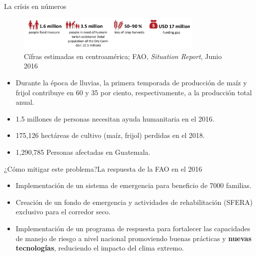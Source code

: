 \documentclass[]{beamer}
\begin{document}
\begin{frame}{La crísis en números}
    \begin{figure}
        \centering
        \includegraphics[width=0.8\textwidth]{Docs/cs_in_numbers}
        \caption{Cífras estimadas en centroamérica;  FAO, \textit{Situation Report}, Junio 2016}
        \label{fig:my_label}
    \end{figure}
    \begin{itemize}
      \item Durante la época de lluvias, la primera temporada de producción de maíz y frijol contribuye en 60 y 35 por ciento, respectivamente, a la producción total anual.
      \item 1.5 millones de personas necesitan ayuda humanitaria en el 2016. %
      \item 175,126 hectáreas de cultivo (maíz, frijol) perdidas en el 2018. %
      \item 1,290,785 Personas afectadas en Guatemala. %
    \end{itemize}
\end{frame}

\begin{frame}{¿Cómo mitigar este problema?}{La respuesta de la FAO en el 2016}
      \begin{itemize}
        \item Implementación de un sistema de emergencia  para beneficio de 7000 familias.
        \item Creación de un fondo de emergencia y actividades de rehabilitación (SFERA) exclusivo para el corredor seco.
        \item Implementación de un programa de respuesta para fortalecer las capacidades de manejo de riesgo a nivel nacional promoviendo buenas prácticas y \textbf{nuevas tecnologías}, reduciendo el impacto del clima extremo.
      \end{itemize}

\end{frame}
\end{document}
